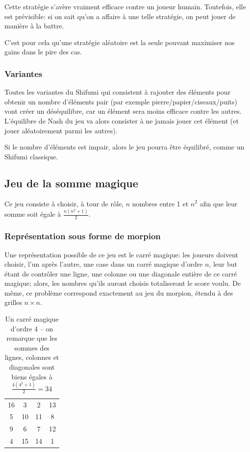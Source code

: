     Cette stratégie s'avère vraiment efficace contre un joueur humain.
    Toutefois, elle est prévisible: si on sait qu'on a affaire à une telle
    stratégie, on peut jouer de manière à la battre.

    C'est pour cela qu'une stratégie aléatoire est la seule pouvant maximiser
    nos gains dans le pire des cas.

  \subsubsection{Variantes}
    Toutes les variantes du Shifumi qui consistent à rajouter des éléments
    pour obtenir un nombre d'éléments pair (par exemple
    pierre/papier/ciseaux/puits) vont créer un déséquilibre, car un élément
    sera moins efficace contre les autres.
    L'équilibre de Nash du jeu va
    alors consister à ne jamais jouer cet élément (et jouer aléatoirement parmi
    les autres).

    Si le nombre d'éléments est impair, alors le jeu pourra être équilibré,
    comme un Shifumi classique.

\subsection{Jeu de la somme magique}
  Ce jeu consiste à choisir, à tour de rôle, $n$ nombres entre 1 et $n^2$ afin
  que leur somme soit égale à $\frac{n(n^2+1)}{2}$.

  \subsubsection{Représentation sous forme de morpion}
Une représentation possible de ce jeu est le carré magique: les
joueurs doivent choisir, l'un après l'autre, une case dans un carré
magique d'ordre $n$, leur but étant de contrôler une ligne, une colonne ou une
diagonale entière de ce carré magique; alors, les nombres qu'ils auront
choisis totaliseront le score voulu. De même, ce problème correspond exactement
au jeu du morpion, étendu à des grilles $n \times n$.

\begin{table}[h]
  \centering
  \begin{tabular}{|cccc|}
    \hline
    16 & 3  & 2  & 13 \\
    5  & 10 & 11 & 8  \\
    9  & 6  & 7  & 12 \\
    4  & 15 & 14 & 1  \\
    \hline
  \end{tabular}
  \caption{Un carré magique d'ordre 4 -- on remarque que les sommes des lignes,
    colonnes et diagonales sont biens égales à $\frac {4(4^2+1)} 2 = 34$}
\end{table}


